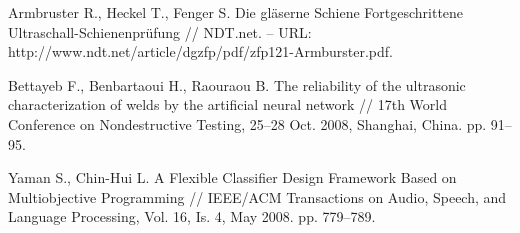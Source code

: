 \documentclass[a4paper, 12pt]{article}
\begin{document}
\begin{thebibliography}{3}

	Armbruster R., Heckel T., Fenger S. Die gläserne Schiene Fortgeschrittene Ultraschall-Schienenprüfung // NDT.net. – URL: http://www.ndt.net/article/dgzfp/pdf/zfp121-Armburster.pdf.
	
	Bettayeb F., Benbartaoui H., Raouraou B. The reliability of the ultrasonic characterization of welds by the artificial neural network // 17th World Conference on Nondestructive Testing, 25–28 Oct. 2008, Shanghai, China. pp. 91–95.
	
	Yaman S., Chin-Hui L. A Flexible Classifier Design Framework Based on Multiobjective Programming // IEEE/ACM Transactions on Audio, Speech, and Language Processing, Vol. 16, Is. 4, May 2008. pp. 779–789.

\end{thebibliography}
\end{document}
